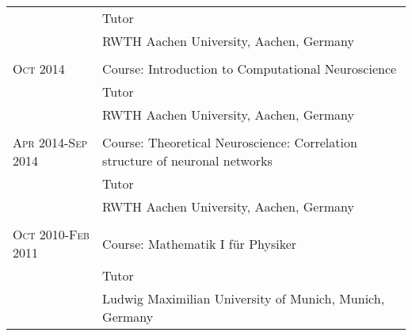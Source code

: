 \begin{longtable}{>{\hfill}p{3.15cm}|p{10.4cm}}
  & \footnotesize Tutor \\
  & \footnotesize RWTH Aachen University, Aachen, Germany \\
  \multicolumn{2}{c}{} \\
  \textsc{Oct} 2014 & Course: Introduction to Computational Neuroscience \\
  & \footnotesize Tutor \\
  & \footnotesize RWTH Aachen University, Aachen, Germany \\
  \multicolumn{2}{c}{} \\
  \textsc{Apr} 2014-\textsc{Sep} 2014 & Course: Theoretical Neuroscience: Correlation structure of neuronal networks \\ 
  & \footnotesize Tutor \\
  & \footnotesize RWTH Aachen University, Aachen, Germany \\
  \multicolumn{2}{c}{} \\
  \textsc{Oct} 2010-\textsc{Feb} 2011 & Course: Mathematik I f\"ur Physiker \\
  & \footnotesize Tutor \\
  & \footnotesize Ludwig Maximilian University of Munich, Munich, Germany \\
\end{longtable}